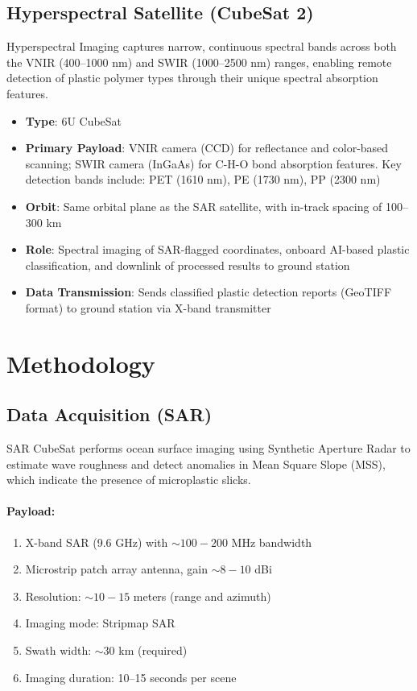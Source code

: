 \documentclass[12pt]{article}
\begin{document}
\subsection{Hyperspectral Satellite (CubeSat 2)}
Hyperspectral Imaging captures narrow, continuous spectral bands across both the VNIR (400--1000 nm) and SWIR (1000--2500 nm) ranges, enabling remote detection of plastic polymer types through their unique spectral absorption features.
\begin{itemize}
    \item \textbf{Type}: 6U CubeSat
    \item \textbf{Primary Payload}: VNIR camera (CCD) for reflectance and color-based scanning; SWIR camera (InGaAs) for C-H-O bond absorption features. Key detection bands include: PET (1610 nm), PE (1730 nm), PP (2300 nm)
    \item \textbf{Orbit}: Same orbital plane as the SAR satellite, with in-track spacing of 100--300 km
    \item \textbf{Role}: Spectral imaging of SAR-flagged coordinates, onboard AI-based plastic classification, and downlink of processed results to ground station
    \item \textbf{Data Transmission}: Sends classified plastic detection reports (GeoTIFF format) to ground station via X-band transmitter
\end{itemize}

\section{Methodology}
\subsection{Data Acquisition (SAR)}
SAR CubeSat performs ocean surface imaging using Synthetic Aperture Radar to estimate wave roughness and detect anomalies in Mean Square Slope (MSS), which indicate the presence of microplastic slicks.
\paragraph{Payload:}
\begin{enumerate}
    \item X-band SAR (9.6 GHz) with $\sim 100-200$ MHz bandwidth
    \item Microstrip patch array antenna, gain $\sim 8-10$ dBi
    \item Resolution: $\sim 10-15$ meters (range and azimuth)
    \item Imaging mode: Stripmap SAR
    \item Swath width: $\sim 30$ km (required)
    \item Imaging duration: 10--15 seconds per scene
\end{enumerate}
\end{document}
